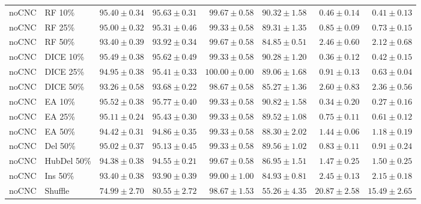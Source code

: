 {\begin{longtable}{llrrrrrr}
noCNC & RF 10\% & $95.40\pm0.34$ & $95.63\pm0.31$ & $99.67\pm0.58$ & $90.32\pm1.58$ & $0.46\pm0.14$ & $0.41\pm0.13$ \\
noCNC & RF 25\% & $95.00\pm0.32$ & $95.31\pm0.46$ & $99.33\pm0.58$ & $89.31\pm1.35$ & $0.85\pm0.09$ & $0.73\pm0.15$ \\
noCNC & RF 50\% & $93.40\pm0.39$ & $93.92\pm0.34$ & $99.67\pm0.58$ & $84.85\pm0.51$ & $2.46\pm0.60$ & $2.12\pm0.68$ \\
noCNC & DICE 10\% & $95.49\pm0.38$ & $95.62\pm0.49$ & $99.33\pm0.58$ & $90.28\pm1.20$ & $0.36\pm0.12$ & $0.42\pm0.15$ \\
noCNC & DICE 25\% & $94.95\pm0.38$ & $95.41\pm0.33$ & $100.00\pm0.00$ & $89.06\pm1.68$ & $0.91\pm0.13$ & $0.63\pm0.04$ \\
noCNC & DICE 50\% & $93.26\pm0.58$ & $93.68\pm0.22$ & $98.67\pm0.58$ & $85.27\pm1.36$ & $2.60\pm0.83$ & $2.36\pm0.56$ \\
noCNC & EA 10\% & $95.52\pm0.38$ & $95.77\pm0.40$ & $99.33\pm0.58$ & $90.82\pm1.58$ & $0.34\pm0.20$ & $0.27\pm0.16$ \\
noCNC & EA 25\% & $95.11\pm0.24$ & $95.43\pm0.30$ & $99.33\pm0.58$ & $89.52\pm1.08$ & $0.75\pm0.11$ & $0.61\pm0.12$ \\
noCNC & EA 50\% & $94.42\pm0.31$ & $94.86\pm0.35$ & $99.33\pm0.58$ & $88.30\pm2.02$ & $1.44\pm0.06$ & $1.18\pm0.19$ \\
noCNC & Del 50\% & $95.02\pm0.37$ & $95.13\pm0.45$ & $99.33\pm0.58$ & $89.56\pm1.02$ & $0.83\pm0.11$ & $0.91\pm0.24$ \\
noCNC & HubDel 50\% & $94.38\pm0.38$ & $94.55\pm0.21$ & $99.67\pm0.58$ & $86.95\pm1.51$ & $1.47\pm0.25$ & $1.50\pm0.25$ \\
noCNC & Ins 50\% & $93.40\pm0.38$ & $93.90\pm0.39$ & $99.00\pm1.00$ & $84.93\pm0.81$ & $2.45\pm0.13$ & $2.15\pm0.18$ \\
noCNC & Shuffle & $74.99\pm2.70$ & $80.55\pm2.72$ & $98.67\pm1.53$ & $55.26\pm4.35$ & $20.87\pm2.58$ & $15.49\pm2.65$ \\
\end{longtable}
}

